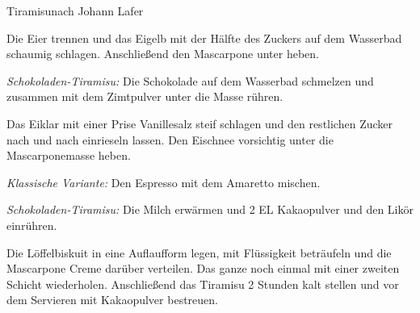 \begin{recipe}{Tiramisu}{nach Johann Lafer}
  \label{Tiramisu}
  \inglist[Grundzutaten:]


  
  \steps 
  
  Die Eier trennen und das Eigelb mit der Hälfte des Zuckers auf dem Wasserbad schaumig
  schlagen.  Anschließend den Mascarpone unter heben. 

  \emph{Schokoladen-Tiramisu:} Die Schokolade auf dem Wasserbad schmelzen und zusammen mit
  dem Zimtpulver unter die Masse rühren.
  
  Das Eiklar mit einer Prise Vanillesalz steif schlagen und den restlichen Zucker nach und
  nach einrieseln lassen.  Den Eischnee vorsichtig unter die Mascarponemasse heben.

  \emph{Klassische Variante:} Den Espresso mit dem Amaretto mischen.
  
  \emph{Schokoladen-Tiramisu:} Die Milch erwärmen und 2 EL Kakaopulver und den Likör
  einrühren.

  Die Löffelbiskuit in eine Auflaufform legen, mit Flüssigkeit beträufeln und die
  Mascarpone Creme darüber verteilen.  Das ganze noch einmal mit einer zweiten Schicht
  wiederholen. Anschließend das Tiramisu 2 Stunden kalt stellen und vor dem Servieren mit
  Kakaopulver bestreuen.
\end{recipe}
